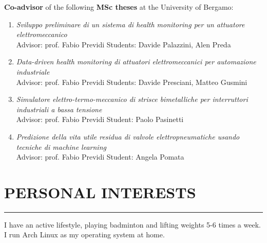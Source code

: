 \documentclass[10pt]{article}
\newcommand{\cvsection}[1]{\section*{\centering\normalsize\uppercase{#1}}\vspace{-16pt}\rule{\linewidth}{0.2pt}}
\begin{document}
\vspace{6pt} %

\textbf{Co-advisor} of the following \textbf{MSc theses} at the University of Bergamo:
\begin{enumerate}
	\setlength\itemsep{-3pt}
	\item \textit{Sviluppo preliminare di un sistema di health monitoring per un attuatore elettromeccanico}\\
	Advisor: prof. Fabio Previdi \hfill Students: Davide Palazzini, Alen Preda
	\item \textit{Data-driven health monitoring di attuatori elettromeccanici per automazione industriale}\\
	Advisor: prof. Fabio Previdi \hfill Students: Davide Presciani, Matteo Gusmini
	\item \textit{Simulatore elettro-termo-meccanico di strisce bimetalliche per interruttori industriali a bassa tensione}\\
	Advisor: prof. Fabio Previdi \hfill Student: Paolo Pasinetti
	\item \textit{Predizione della vita utile residua di valvole elettropneumatiche usando tecniche di machine learning}\\
	Advisor: prof. Fabio Previdi \hfill Student: Angela Pomata
\end{enumerate}


\clearpage


\cvsection{personal interests}
I have an active lifestyle, playing badminton and lifting weights 5-6 times a week. I run Arch Linux as my operating system at home. 
\end{document}
